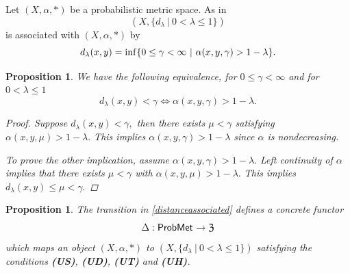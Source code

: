 \documentclass[12pt,a4paper]{amsart}
\theoremstyle{theorem}
\newtheorem{proposition}[theorem]{Proposition}
\theoremstyle{definition}
\newcommand{\PM}{\ensuremath{\mathsf{ProbMet_{}}}}
\renewcommand{\inf}{\myinf}
\DeclareMathOperator*{\myinf}{in\vphantom{p}f}
\renewcommand{\a}{\ensuremath{\alpha}}
\renewcommand{\l}{\ensuremath{\lambda}}
\def\rw{\rightarrow}
\begin{document}
{\vspace{.7cm}

Let $(X,\a,*)$ be a probabilistic metric space. As in \cite{N}
\begin{equation}\label{distanceassociated}
(X, \{ d_\l \ | \ 0 < \l \leq 1 \})  
\end{equation}
 is associated with $(X,\a,*)$ by
$$  d_\l(x,y) = \inf \{ 0 \leq \gamma < \infty \ | \ \a(x,y,\gamma) > 1 - \l \}.$$

\begin{proposition}
We have the following equivalence, 
for $0 \leq \gamma < \infty$ and for $0 < \l \leq 1$ 
 \begin{equation}\label{isoequiv}
d_\l (x,y) < \gamma \Leftrightarrow \a(x,y,\gamma) > 1-\l.
\end{equation}
\begin{proof}
Suppose $d_\l (x,y)< \gamma,$ then there exists $\mu < \gamma$ satisfying $\a(x,y,\mu) > 1-\l.$
This implies $\a(x,y,\gamma) > 1-\l$ since $\a$ is nondecreasing.

To prove the other implication, assume $\a(x,y,\gamma) > 1-\l.$ Left continuity of $\a$ implies that there exists $\mu < \gamma$ with $ \a(x,y,\mu) > 1-\l.$ This implies\\
 $d_\l(x,y) \leq \mu < \gamma.$
\end{proof}
\end{proposition}

\begin{proposition}\label{delta} 
The transition in \eqref{distanceassociated} defines a concrete functor  $$\Delta: \PM \rw \frak{Z} $$ which maps an object $(X,\a, *)$ to  $(X, \{ d_\l \ | \ 0 < \l \leq 1 \})$ satisfying the conditions
{\bf(US)}, {\bf(UD)}, {\bf(UT)} and {\bf(UH)}.


\end{proposition}}
\end{document}
